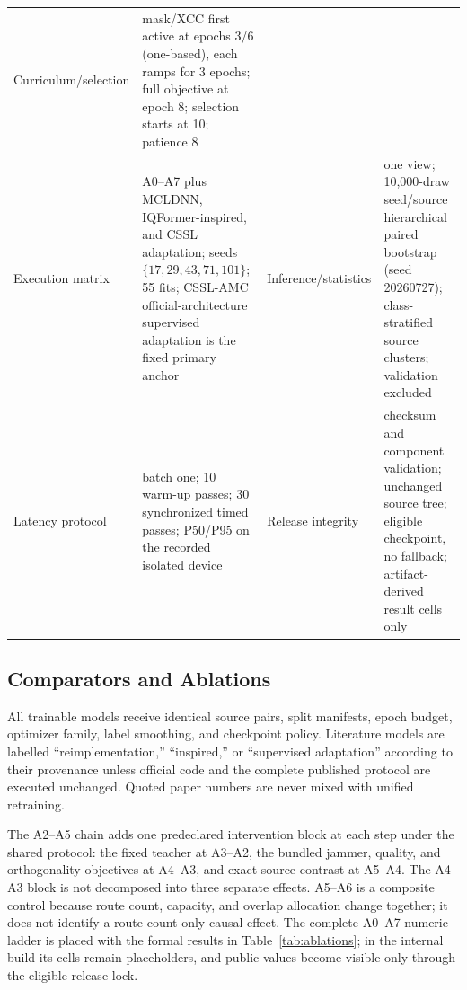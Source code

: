 \documentclass[letterpaper,journal]{IEEEtran}
\begin{document}
\begin{table}[t]
\begin{tabular}{@{}p{}p{}p{}p{}@{}}
Curriculum/selection & mask/XCC first active at epochs 3/6 (one-based), each
ramps for 3 epochs; full objective at epoch 8; selection starts at 10;
patience 8\\
Execution matrix & A0--A7 plus MCLDNN, IQFormer-inspired, and CSSL
adaptation; seeds $\{17,29,43,71,101\}$; 55 fits; CSSL-AMC
official-architecture supervised adaptation is the fixed primary anchor &
Inference/statistics & one view; 10,000-draw seed/source hierarchical paired
bootstrap (seed 20260727); class-stratified source clusters; validation
excluded\\
Latency protocol & batch one; 10 warm-up passes; 30 synchronized timed
passes; P50/P95 on the recorded isolated device &
Release integrity & checksum and component validation; unchanged source tree;
eligible checkpoint, no fallback; artifact-derived result cells only\\
\bottomrule
\end{tabular}
\end{table}

\subsection{Comparators and Ablations}
All trainable models receive identical source pairs, split manifests, epoch
budget, optimizer family, label smoothing, and checkpoint policy.  Literature
models are labelled ``reimplementation,'' ``inspired,'' or ``supervised
adaptation'' according to their provenance unless official code and the
complete published protocol are executed unchanged.  Quoted paper numbers are
never mixed with unified retraining.

The A2--A5 chain adds one predeclared intervention block at each step under
the shared protocol: the fixed teacher at A3--A2, the bundled jammer, quality,
and orthogonality objectives at A4--A3, and exact-source contrast at A5--A4.
The A4--A3 block is not decomposed into three separate effects.  A5--A6 is a
composite control because route count, capacity, and overlap allocation change
together; it does not identify a route-count-only causal effect.
The complete A0--A7 numeric ladder is placed with the formal results in
Table~\ref{tab:ablations}; in the internal build its cells remain placeholders,
and public values become visible only through the eligible release lock.
\end{document}
